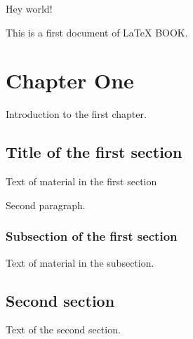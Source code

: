 \documentclass{book}
\begin{document}
Hey world!

This is a first document of LaTeX BOOK.


\chapter{Chapter One}
Introduction to the first chapter.


\section{Title of the first section}
Text of material in the first section

Second paragraph.

\subsection{Subsection of the first section}

Text of material in the subsection.


\section{Second section}

Text of the second section.
\end{document}
